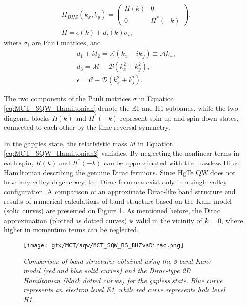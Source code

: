 \documentclass[titlepage,a4paper]{book}
\begin{document}
\begin{equation}
\label{eq:MCT_SQW_Hamiltonian}
\begin{aligned}
H_{BHZ}(k_x, k_y) =  \left( \begin{array}{cc}
H(k) & 0 \\
0 & H^*(-k) \end{array} \right), \\
H = \epsilon (k) + d_i (k) \sigma_i,
\end{aligned}
\end{equation}
where $\sigma_i$ are Pauli matrices, and
\begin{equation}
\label{eq:MCT_SQW_Hamiltonian2}
\begin{aligned}
d_1 + id_2 = \mathcal{A}(k_x - ik_y) \equiv \mathcal{A}k_-, \\
d_3 = \mathcal{M} - \mathcal{B}(k_x^2 + k_y^2), \\
\epsilon = \mathcal{C} - \mathcal{D}(k_x^2 + k_y^2).
\end{aligned}
\end{equation}

The two components of the Pauli matrices $\sigma$ in Equation \ref{eq:MCT_SQW_Hamiltonian} denote the E1 and H1 subbands, while the two diagonal blocks $H(k)$ and $H^*(-k)$ represent spin-up and spin-down states, connected to each other by the time reversal symmetry. 

In the gapples state, the relativistic mass $M$ in Equation \ref{eq:MCT_SQW_Hamiltonian2} vanishes. By neglecting the nonlinear terms in each spin, $H(k)$ and $H^*(-k)$ can be approximated with the massless Dirac Hamiltonian describing the genuine Dirac fermions. Since HgTe QW does not have any valley degeneracy, the Dirac fermions exist only in a single valley configuration. A comparison of an approximate Dirac-like band structure and results of numerical calculations of band structure based on the Kane model (solid curves) are presented on Figure \ref{fig:MCT_SQW_BS_BHZvsDirac}. As mentioned before, the Dirac approximation (plotted as dotted curves) is valid in the vicinity of \textbf{\textit{k}} = 0, where higher in momentum terms can be neglected.  

\begin{figure}[H]
	\centering
	\texttt{[image: gfx/MCT/sqw/MCT\_SQW\_BS\_BHZvsDirac.png]}
	\vspace{-10pt}
	\caption{\textit{Comparison of band structures obtained using the 8-band Kane model (red and blue solid curves) and the Dirac-type 2D Hamiltonian (black dotted curves) for the gapless state. Blue curve represents an electron level E1, while red curve represents hole level H1.}}
	\label{fig:MCT_SQW_BS_BHZvsDirac}
\end{figure} 
\end{document}
